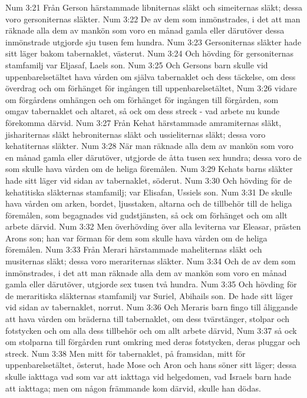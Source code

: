 Num 3:21  Från Gerson härstammade libniternas släkt och simeiternas släkt; dessa voro gersoniternas släkter.
Num 3:22  De av dem som inmönstrades, i det att man räknade alla dem av mankön som voro en månad gamla eller därutöver dessa inmönstrade utgjorde sju tusen fem hundra.
Num 3:23  Gersoniternas släkter hade sitt läger bakom tabernaklet, västerut.
Num 3:24  Och hövding för gersoniternas stamfamilj var Eljasaf, Laels son.
Num 3:25  Och Gersons barn skulle vid uppenbarelsetältet hava vården om själva tabernaklet och dess täckelse, om dess överdrag och om förhänget för ingången till uppenbarelsetältet,
Num 3:26  vidare om förgårdens omhängen och om förhänget för ingången till förgården, som omgav tabernaklet och altaret, så ock om dess streck - vad arbete nu kunde förekomma därvid.
Num 3:27  Från Kehat härstammade amramiternas släkt, jishariternas släkt hebroniternas släkt och ussieliternas släkt; dessa voro kehatiternas släkter.
Num 3:28  När man räknade alla dem av mankön som voro en månad gamla eller därutöver, utgjorde de åtta tusen sex hundra; dessa voro de som skulle hava vården om de heliga föremålen.
Num 3:29  Kehats barns släkter hade sitt läger vid sidan av tabernaklet, söderut.
Num 3:30  Och hövding för de kehatitiska släkternas stamfamilj; var Elisafan, Ussiels son.
Num 3:31  De skulle hava vården om arken, bordet, ljusstaken, altarna och de tillbehör till de heliga föremålen, som begagnades vid gudstjänsten, så ock om förhänget och om allt arbete därvid.
Num 3:32  Men överhövding över alla leviterna var Eleasar, prästen Arons son; han var förman för dem som skulle hava vården om de heliga föremålen.
Num 3:33  Från Merari härstammade maheliternas släkt och musiternas släkt; dessa voro merariternas släkter.
Num 3:34  Och de av dem som inmönstrades, i det att man räknade alla dem av mankön som voro en månad gamla eller därutöver, utgjorde sex tusen två hundra.
Num 3:35  Och hövding för de meraritiska släkternas stamfamilj var Suriel, Abihails son. De hade sitt läger vid sidan av tabernaklet, norrut.
Num 3:36  Och Meraris barn fingo till åliggande att hava vården om bräderna till tabernaklet, om dess tvärstänger, stolpar och fotstycken och om alla dess tillbehör och om allt arbete därvid,
Num 3:37  så ock om stolparna till förgården runt omkring med deras fotstycken, deras pluggar och streck.
Num 3:38  Men mitt för tabernaklet, på framsidan, mitt för uppenbarelsetältet, österut, hade Mose och Aron och hans söner sitt läger; dessa skulle iakttaga vad som var att iakttaga vid helgedomen, vad Israels barn hade att iakttaga; men om någon främmande kom därvid, skulle han dödas.
